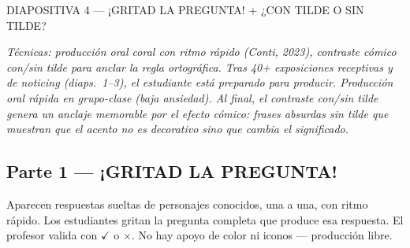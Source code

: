 \documentclass[a4paper,10pt]{article}
\newcommand{\diapheader}[2]{%
  \noindent\begin{tcolorbox}[
    colback=naranja,
    colframe=naranja,
    coltext=white,
    fontupper=\bfseries\large,
    boxrule=0pt,
    arc=3pt,
    left=6pt, right=6pt, top=4pt, bottom=4pt
  ]
  DIAPOSITIVA #1 — #2
  \end{tcolorbox}
}
\begin{document}
\newpage


\diapheader{4}{¡GRITAD LA PREGUNTA! + ¿CON TILDE O SIN TILDE?}

\vspace{0.2cm}

\begin{marsbox}
\textit{Técnicas: producción oral coral con ritmo rápido (Conti, 2023), contraste cómico con/sin tilde para anclar la regla ortográfica. Tras 40+ exposiciones receptivas y de noticing (diaps.~1--3), el estudiante está preparado para producir. Producción oral rápida en grupo-clase (baja ansiedad). Al final, el contraste con/sin tilde genera un anclaje memorable por el efecto cómico: frases absurdas sin tilde que muestran que el acento no es decorativo sino que cambia el significado.}
\end{marsbox}

\vspace{0.4cm}

\subsection*{\textcolor{naranja}{Parte 1 --- ¡GRITAD LA PREGUNTA!}}

{\small Aparecen respuestas sueltas de personajes conocidos, una a una, con ritmo rápido. Los estudiantes gritan la pregunta completa que produce esa respuesta. El profesor valida con $\checkmark$ o $\times$. No hay apoyo de color ni iconos --- producción libre.}

\vspace{0.3cm}
\end{document}

